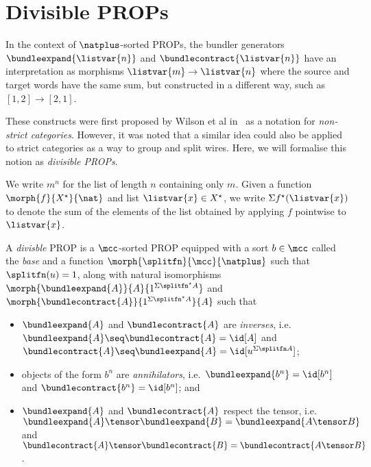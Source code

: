\section{Divisible PROPs}

In the context of \(\natplus\)-sorted PROPs, the bundler generators
\(\bundleexpand{\listvar{n}}\) and \(\bundlecontract{\listvar{n}}\) have an
interpretation as morphisms
\(\listvar{m} \to \listvar{n}\) where the source and target words have the
same sum, but constructed in a different way, such as \([1,2] \to [2,1]\).


These constructs were first proposed by Wilson et al in~\cite{wilson2023string}
as a notation for \emph{non-strict categories}.
However, it was noted that a similar idea could also be applied to strict
categories as a way to group and split wires.
Here, we will formalise this notion as \emph{divisible PROPs}.

\begin{notation}
    We write \(m^n\) for the list of length \(n\) containing only \(m\).
    Given a function \(\morph{f}{X^\star}{\nat}\) and list
    \(\listvar{x} \in X^\star\), we write \(\Sigma{f^\star(\listvar{x})}\) to
    denote the sum of the elements of the list obtained by applying \(f\)
    pointwise to \(\listvar{x}\).
\end{notation}

\begin{definition}
    A \emph{divisble} PROP is a \(\mcc\)-sorted PROP equipped
    with a sort \(b \in \mcc\) called the \emph{base} and a function \(
        \morph{\splitfn}{\mcc}{\natplus}
    \) such that \(\splitfn(u) = 1\), along with natural isomorphisms \(
        \morph{\bundleexpand{A}}{A}{1^{\Sigma\splitfn^\star{A}}}
    \) and \(
        \morph{\bundlecontract{A}}{1^{\Sigma\splitfn^\star{A}}}{A}
    \) such that
    \begin{itemize}
        \item \(\bundleexpand{A}\) and \(\bundlecontract{A}\)
                are \emph{inverses}, i.e.\ \(
                    \bundleexpand{A} \seq \bundlecontract{A} = \id[A]
                \) and \(
                    \bundlecontract{A} \seq \bundleexpand{A} = \id[u^{\Sigma\splitfn A}]
                \);
        \item objects of the form \(b^{n}\) are \emph{annihilators},
                i.e.\ \(
                    \bundleexpand{b^n} = \id[b^n]
                \) and \(
                    \bundlecontract{b^n} = \id[b^n]
                \); and
        \item \(\bundleexpand{A}\) and \(\bundlecontract{A}\) respect the
                tensor, i.e.\ \(
                    \bundleexpand{A} \tensor \bundleexpand{B}
                    =
                    \bundleexpand{A \tensor B}
                \) and \(
                    \bundlecontract{A} \tensor \bundlecontract{B}
                    =
                    \bundlecontract{A \tensor B}
                \).
    \end{itemize}
\end{definition}

